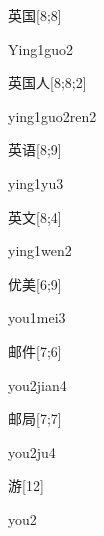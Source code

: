 \begin{verbete}{英国}[8;8]
\begin{pronuncia}{Ying1guo2}
\end{pronuncia}
\end{verbete}

\begin{verbete}{英国人}[8;8;2]
\begin{pronuncia}{ying1guo2ren2}
\end{pronuncia}
\end{verbete}

\begin{verbete}[ying1yu3]{英语}[8;9]
\begin{pronuncia}{ying1yu3}
\end{pronuncia}
\end{verbete}

\begin{verbete}{英文}[8;4]
\begin{pronuncia}{ying1wen2}
\end{pronuncia}
\end{verbete}

\begin{verbete}{优美}[6;9]
\begin{pronuncia}{you1mei3}
\end{pronuncia}
\end{verbete}

\begin{verbete}{邮件}[7;6]
\begin{pronuncia}{you2jian4}
\end{pronuncia}
\end{verbete}

\begin{verbete}[you2ju4]{邮局}[7;7]
\begin{pronuncia}{you2ju4}
\end{pronuncia}
\end{verbete}

\begin{verbete}[you2]{游}[12]
\begin{pronuncia}{you2}
\end{pronuncia}
\end{verbete}

